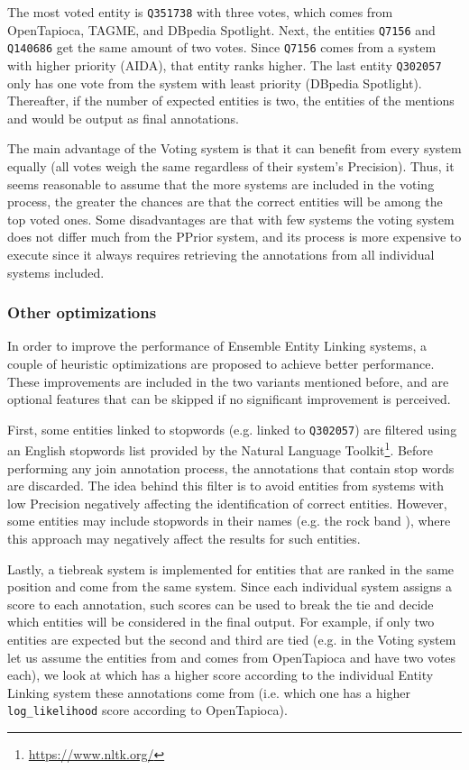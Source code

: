 The most voted entity is \texttt{Q351738} with three votes, which comes from OpenTapioca, TAGME, 
and DBpedia Spotlight. Next, the entities \texttt{Q7156} and \texttt{Q140686} get the same 
amount of two votes. Since \texttt{Q7156} comes from a system with higher priority (AIDA), that 
entity ranks higher. The last entity \texttt{Q302057} only has one vote from the system with 
least priority (DBpedia Spotlight). Thereafter, if the number of expected entities is two, the 
entities of the mentions  and  would be 
output as final annotations.

The main advantage of the Voting system is that it can benefit from every system equally (all 
votes weigh the same regardless of their system’s Precision). Thus, it seems reasonable to 
assume that the more systems are included in the voting process, the greater the chances are 
that the correct entities will be among the top voted ones. Some disadvantages are that with 
few systems the voting system does not differ much from the PPrior system, and its process is 
more expensive to execute since it always requires retrieving the annotations from all 
individual systems included.

\subsubsection{Other optimizations}
\label{cap3:system/entLinModule/ensembleSystems/optimizations}
In order to improve the performance of Ensemble Entity Linking systems, a couple of heuristic 
optimizations are proposed to achieve better performance. These improvements are included in 
the two variants mentioned before, and are optional features that can be skipped if no 
significant improvement is perceived. 

First, some entities linked to stopwords (e.g.  linked to \texttt{Q302057}) are 
filtered using an English stopwords list provided by the Natural Language Toolkit\footnote{\url{https://www.nltk.org/}}. 
Before performing any join annotation process, the annotations that contain stop words are 
discarded. The idea behind this filter is to avoid entities from systems with low Precision 
negatively affecting the identification of correct entities. However, some entities may 
include stopwords in their names (e.g. the rock band ), where this approach 
may negatively affect the results for such entities.

Lastly, a tiebreak system is implemented for entities that are ranked in the same position 
and come from the same system. Since each individual system assigns a score to each annotation, 
such scores can be used to break the tie and decide which entities will be considered in the 
final output. For example, if only two entities are expected but the second and third are 
tied (e.g. in the Voting system let us assume the entities from  
and  comes from OpenTapioca and have two votes each), we look at which 
has a higher score according to the individual Entity Linking system these annotations come from 
(i.e. which one has a higher \texttt{log\_likelihood} score according to OpenTapioca). 

